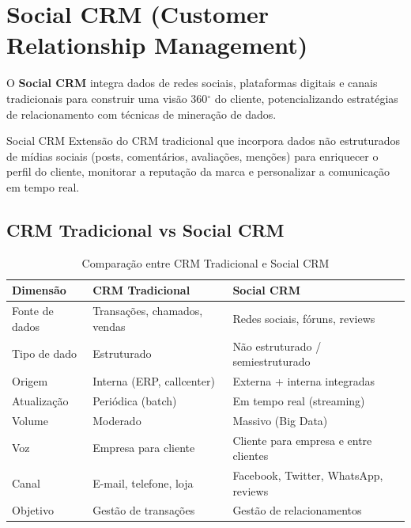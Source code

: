 \documentclass[12pt,a4paper]{article}
\begin{document}
\section{Social CRM (Customer Relationship Management)}

O \textbf{Social CRM} integra dados de redes sociais, plataformas digitais e canais tradicionais para construir uma visão 360$^\circ$ do cliente, potencializando estratégias de relacionamento com técnicas de mineração de dados.

\begin{definicaobox}{Social CRM}
Extensão do CRM tradicional que incorpora dados não estruturados de mídias sociais (posts, comentários, avaliações, menções) para enriquecer o perfil do cliente, monitorar a reputação da marca e personalizar a comunicação em tempo real.
\end{definicaobox}

\subsection{CRM Tradicional vs Social CRM}

\begin{table}[ht]
\centering
\caption{Comparação entre CRM Tradicional e Social CRM}
\begin{tabular}{@{}lll@{}}
\toprule
\textbf{Dimensão} & \textbf{CRM Tradicional} & \textbf{Social CRM} \\
\midrule
Fonte de dados & Transações, chamados, vendas & Redes sociais, fóruns, reviews \\
Tipo de dado & Estruturado & Não estruturado / semiestruturado \\
Origem & Interna (ERP, callcenter) & Externa + interna integradas \\
Atualização & Periódica (batch) & Em tempo real (streaming) \\
Volume & Moderado & Massivo (Big Data) \\
Voz & Empresa para cliente & Cliente para empresa e entre clientes \\
Canal & E-mail, telefone, loja & Facebook, Twitter, WhatsApp, reviews \\
Objetivo & Gestão de transações & Gestão de relacionamentos \\
\bottomrule
\end{tabular}
\end{table}
\end{document}
